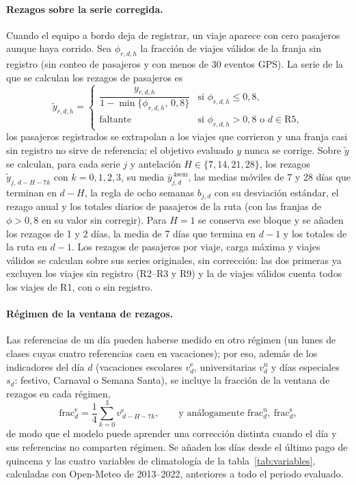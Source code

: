 \paragraph{Rezagos sobre la serie corregida.}
Cuando el equipo a bordo deja de registrar, un viaje aparece con cero pasajeros aunque haya corrido. Sea
$\phi_{r,d,h}$ la fracción de viajes válidos de la franja sin registro (sin conteo de pasajeros y con menos
de 30 eventos GPS). La serie de la que se calculan los rezagos de pasajeros es
\begin{equation}
  \tilde{y}_{r,d,h} =
  \begin{cases}
    \dfrac{y_{r,d,h}}{1 - \min\{\phi_{r,d,h},\, 0{,}8\}} & \text{si } \phi_{r,d,h} \leq 0{,}8, \\[8pt]
    \text{faltante} & \text{si } \phi_{r,d,h} > 0{,}8 \text{ o } d \in \text{R5},
  \end{cases}
  \label{eq:correccion}
\end{equation}
los pasajeros registrados se extrapolan a los viajes que corrieron y una franja casi sin registro no sirve
de referencia; el objetivo evaluado $y$ nunca se corrige. Sobre $\tilde{y}$ se calculan, para cada serie
$j$ y antelación $H \in \{7, 14, 21, 28\}$, los rezagos $\tilde{y}_{j,\,d - H - 7k}$ con $k = 0, 1, 2, 3$, su
media $\bar{y}^{\,4\text{sem}}_{j,d}$, las medias móviles de 7 y 28 días que terminan en $d - H$, la regla de
ocho semanas $b_{j,d}$ con su desviación estándar, el rezago anual y los totales diarios de pasajeros de la
ruta (con las franjas de $\phi > 0{,}8$ en su valor sin corregir). Para $H = 1$ se conserva ese bloque y se
añaden los rezagos de 1 y 2 días, la media de 7 días que termina en $d - 1$ y los totales de la ruta en
$d - 1$. Los rezagos de pasajeros por viaje, carga máxima y viajes válidos se calculan sobre sus series
originales, sin corrección: las dos primeras ya excluyen los viajes sin registro (R2--R3 y R9) y la de
viajes válidos cuenta todos los viajes de R1, con o sin registro.

\paragraph{Régimen de la ventana de rezagos.}
Las referencias de un día pueden haberse medido en otro régimen (un lunes de clases cuyas cuatro referencias
caen en vacaciones); por eso, además de los indicadores del día $d$ (vacaciones escolares
$v^{\mathrm{e}}_d$, universitarias $v^{\mathrm{u}}_d$ y días especiales $s_d$: festivo, Carnaval o Semana
Santa), se incluye la fracción de la ventana de rezagos en cada régimen,
\begin{equation}
  \mathrm{frac}^{\mathrm{e}}_{d} = \frac{1}{4} \sum_{k=0}^{3} v^{\mathrm{e}}_{\,d - H - 7k},
  \qquad \text{y análogamente } \mathrm{frac}^{\mathrm{u}}_{d},\ \mathrm{frac}^{\mathrm{s}}_{d},
  \label{eq:regimen}
\end{equation}
de modo que el modelo puede aprender una corrección distinta cuando el día y sus referencias no comparten
régimen. Se añaden los días desde el último pago de quincena y las cuatro variables de climatología de la
tabla~\ref{tab:variables}, calculadas con Open-Meteo de 2013--2022, anteriores a todo el periodo evaluado.


